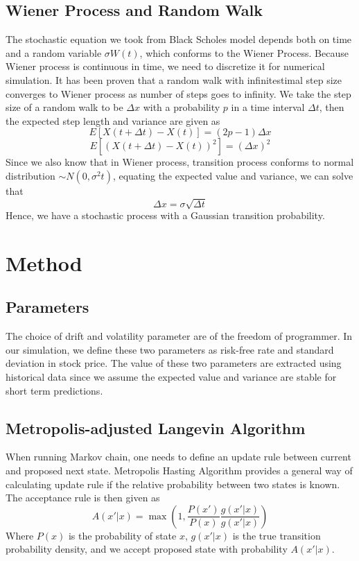 \documentclass[%
 reprint,
 amsmath,amssymb,
 aps,
 nofootinbib,
 showpacs
]{revtex4-1}
\begin{document}
\subsection{Wiener Process and Random Walk}
The stochastic equation we took from Black Scholes model depends both on time and a random variable $\sigma W(t)$, which conforms to the Wiener Process.
Because Wiener process is continuous in time, we need to discretize it for numerical simulation.
It has been proven that a random walk with infinitestimal step size converges to Wiener process as number of steps goes to infinity.
We take the step size of a random walk to be $\Delta x$ with a probability $p$ in a time interval $\Delta t$, then the expected step length and variance are given as
\[
E[X(t+\Delta t)-X(t)] = (2p-1)\Delta x
\]
\[
E[(X(t+\Delta t)-X(t))^2] = (\Delta x)^2
\]
Since we also know that in Wiener process, transition process conforms to normal distribution $\sim N(0,\sigma^2 t)$, equating the expected value and variance, we can solve that
\begin{equation}
\Delta x = \sigma \sqrt{\Delta t}
\end{equation}
Hence, we have a stochastic process with a Gaussian transition probability.
\section{\label{sec:methods} Method}
\subsection{Parameters}
The choice of drift and volatility parameter are of the freedom of programmer.
In our simulation, we define these two parameters as risk-free rate and standard deviation in stock price.
The value of these two parameters are extracted using historical data since we assume the expected value and variance are stable for short term predictions.
\subsection{Metropolis-adjusted Langevin Algorithm}
When running Markov chain, one needs to define an update rule between current and proposed next state.
Metropolis Hasting Algorithm provides a general way of calculating update rule if the relative probability between two states is known.
The acceptance rule is then given as
\begin{equation}
A(x'|x) = \max\left(1,\frac{P(x')}{P(x)}\frac{g(x'|x)}{g(x'|x)}\right)
\end{equation}
Where $P(x)$ is the probability of state $x$, $g(x'|x)$ is the true transition probability density, and we accept proposed state with probability $A(x'|x)$.
\end{document}
